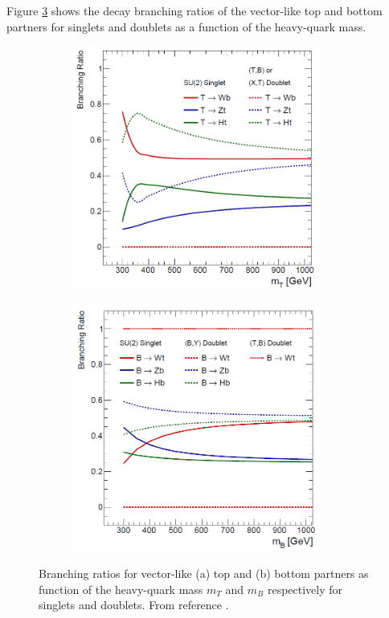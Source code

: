 Figure \ref{fig:theo:VLQBRs} shows the decay branching ratios of the vector-like top and bottom partners for singlets and doublets as a function of the heavy-quark mass.
  
\begin{figure}[t!]
\begin{subfigure}{0.5\textwidth}
  \centering
  \includegraphics[width=0.9\textwidth]{figures/Theory/fig_02a.png}
  \caption{}
  \label{}
\end{subfigure}
\begin{subfigure}{0.5\textwidth}
  \centering
  \includegraphics[width=0.9\textwidth]{figures/Theory/fig_02b.png}
  \caption{}
  \label{}
\end{subfigure}

\captionsetup{width=0.85\textwidth} \caption{\small Branching ratios for vector-like (a) top and (b) bottom partners as function of the heavy-quark mass $m_{T}$ and $m_{B}$ respectively for singlets and doublets. From reference \cite{Aguilar-Saavedra:2013qpa}.}
\label{fig:theo:VLQBRs}
\end{figure}

